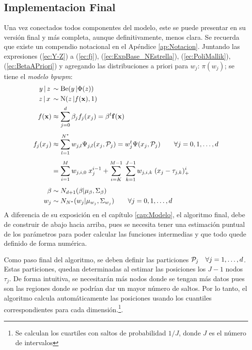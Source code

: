 \documentclass[../Main/Main.tex]{subfiles}
\begin{document}
\subsection{Implementacion Final}
Una vez conectados todos componentes del modelo, este se puede presentar en su versión final y más completa, aunque definitivamente, menos clara. Se recuerda que existe un compendio notacional en el Apéndice \ref{ap:Notacion}. Juntando las expresiones (\ref{ec:Y-Z}) a (\ref{ec:fj}), (\ref{ec:ExpBase_NEstrella}), (\ref{ec:PoliMallik}), (\ref{ec:BetaAPriori}) y agregando las distribuciones a priori para $w_j$: $\pi(w_j)$; se tiene el \textit{modelo bpwpm}:
\begin{align}
	y\,|\,z\, &\sim \text{Be}(y\,|\Phi(z)) \nonumber\\ 
	z\,|\,x\, &\sim \text{N}(z\,|f(\xsn),1)\nonumber \\
	f(\xsn) &\approx \sum_{j=0}^d \beta_j f_j(x_j) 
			= \beta^t\fsn(\xsn)  \nonumber\\[4pt]
	f_j(x_j)&\approx \sum_{l = 1}^{\N} w_{j,l} \Psi_{j,l}(x_j, \mathcal{P}_j) 				=  w_j^t\Psi(x_j,\P_j) \quad\quad \forall j= 0,1,\ldots,d
			\nonumber\\[4pt]
 		 	&=	\sum_{i = 1}^M w_{j,i,0} \; x_j^{i-1} + 
			\sum_{i = K}^{M-1} \;
	 		\sum_{k = 1}^{J-1}w_{j,i,k}\;(x_j - \t_{j,k})_+^{i} 
			\nonumber \\[4pt]	 					
	 		\beta &\sim N_{d+1}(\beta|\mu_{\beta}, \Sigma_{\beta})	\nonumber \\
	w_j  &\sim N_{\N}(w_j|\mu_{w_j},\Sigma_{w_j}) \quad\quad \forall j= 0,1,\ldots,d \label{ec:ModBPWPM}
\end{align}
A diferencia de su exposición en el capítulo \ref{cap:Modelo}, el algoritmo final, debe de construir de abajo hacia arriba, pues se necesita tener una estimación puntual de los parámetros para poder calcular las funciones intermedias y que todo quede definido de forma numérica.

Como paso final del algoritmo, se deben definir las particiones $\P_j \quad \forall j= 1,\ldots,d$. Estas particiones, quedan determinadas al estimar las posiciones los $J-1$ nodos $\tau_j$. De forma intuitiva, se necesitarán más nodos donde se tengan más datos pues son las regiones donde se podrían dar un mayor número de saltos. Por lo tanto, el algoritmo calcula automáticamente las posiciones usando los cuantiles correspondientes para cada dimensión.\footnote{Se calculan los cuartiles con saltos de probabilidad $1/J$, donde $J$ es el número de intervalos}. 
\end{document}
